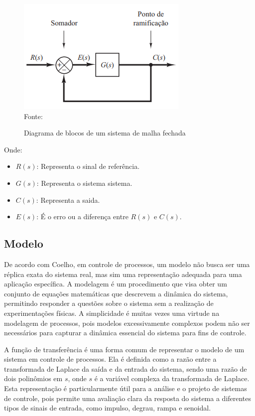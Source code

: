     \begin{figure}[H]
    	\centering
    	\caption{Diagrama de blocos de um sistema de malha fechada}
    	\includegraphics[scale=1]{figuras/closed_loop}
    	\label{fig:closed_loop}
    	\\
        \vspace{0cm}\hspace{0cm}\small{Fonte: \cite[Fig 2.3]{ogata2010engenharia}}
    \end{figure}

Onde:
\begin{itemize}
\item $R(s)$: Representa o sinal de referência.
\item $G(s)$: Representa o sistema sistema.
\item $C(s)$: Representa a saida.
\item $E(s)$: É o erro ou a diferença entre $R(s)$ e $C(s)$.
\end{itemize}

\subsection{Modelo}

De acordo com Coelho\cite{CoelhoIdentificacao}, em controle de processos, um modelo não busca ser uma réplica exata do
sistema real, mas sim uma representação adequada para uma aplicação específica.
A modelagem é um procedimento que visa obter um conjunto de equações matemáticas que descrevem a dinâmica do sistema,
permitindo responder a questões sobre o sistema sem a realização de experimentações físicas.
A simplicidade é muitas vezes uma virtude na modelagem de processos, pois modelos excessivamente complexos podem
não ser necessários para capturar a dinâmica essencial do sistema para fins de controle.

A função de transferência é uma forma comum de representar o modelo de um sistema em controle de processos.
Ela é definida como a razão entre a transformada de Laplace da saída e da entrada do sistema,
sendo uma razão de dois polinômios em $s$, onde $s$ é a variável complexa da transformada de Laplace.
Esta representação é particularmente útil para a análise e o projeto de sistemas de controle,
pois permite uma avaliação clara da resposta do sistema a diferentes tipos de sinais de entrada,
como impulso, degrau, rampa e senoidal.

